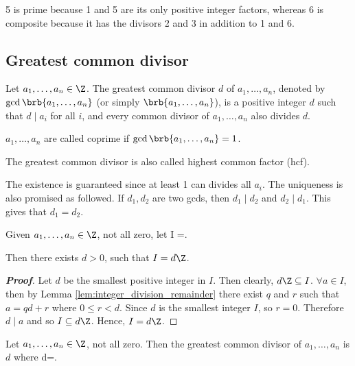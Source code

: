 \begin{example}
5 is prime because 1 and 5 are its only positive integer factors, whereas 6 is composite because it has the divisors 2 and 3 in addition to 1 and 6.
\end{example}


\subsection{Greatest common divisor}

\begin{definition}
Let $a_1,\dots, a_n\in \Z$. The greatest common divisor $d$ of $a_1,\dots,a_n$, denoted by $\gcd\brb{a_1,\dots,a_n}$ (or simply $\brb{a_1,\dots,a_n}$), is a positive integer $d$ such that $d\mid a_i$ for all $i$, and every common divisor of $a_1,\dots, a_n$ also divides $d$.

$a_1,\dots, a_n$ are called coprime if $\gcd\brb{a_1,\dots,a_n} =1$.

The greatest common divisor is also called highest common factor (hcf).
\end{definition}

\begin{remark}
The existence is guaranteed since at least 1 can divides all $a_i$. The uniqueness is also promised as followed. If $d_1,d_2$ are two gcds, then $d_1\mid d_2$ and $d_2\mid d_1$. This gives that $d_1=d_2$.
\end{remark}

\begin{lemma}\label{lem:linear_combination_set_of_integers}
Given $a_1,\dots, a_n\in \Z$, not all zero, let
\be
I =.
\ee

Then there exists $d>0$, such that $I = d \Z$.
\end{lemma}

\begin{proof}[\bf Proof]
Let $d$ be the smallest positive integer in $I$. Then clearly, $d\Z \subseteq I$. $\forall a\in I$, then by Lemma \ref{lem:integer_division_remainder} there exist $q$ and $r$ such that $a = qd+r$ where $0\leq r<d$. Since $d$ is the smallest integer $I$, so $r=0$. Therefore $d\mid a$ and so $I \subseteq d\Z$. Hence, $I = d\Z$.
\end{proof}

\begin{lemma}\label{lem:linear_combination_set_gcd}
Let $a_1,\dots,a_n\in \Z$, not all zero. Then the greatest common divisor of $a_1,\dots,a_n$ is $d$ where
\be
d\Z =.
\ee
\end{lemma}

